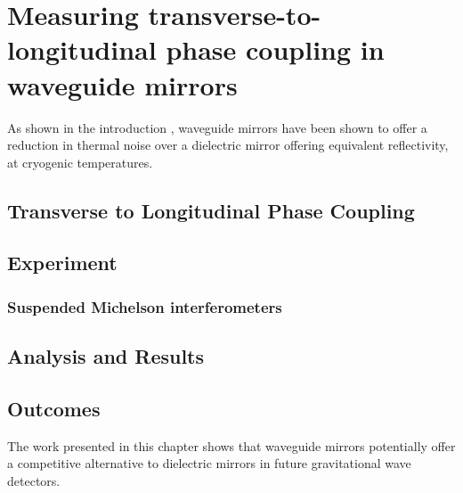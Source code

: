 \chapter{Measuring transverse-to-longitudinal phase coupling in waveguide mirrors}
\label{c:waveguides}

As shown in the introduction , waveguide mirrors have been shown to offer a reduction in thermal noise over a dielectric mirror offering equivalent reflectivity, at cryogenic temperatures.


\section{Transverse to Longitudinal Phase Coupling}

\section{Experiment}

\subsection{Suspended Michelson interferometers}

\section{Analysis and Results}

\section{Outcomes}

The work presented in this chapter shows that waveguide mirrors potentially offer a competitive alternative to dielectric mirrors in future gravitational wave detectors.

